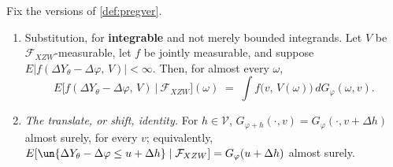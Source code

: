 \begin{lemma}\label{lem:psubst}
Fix the versions of \cref{def:pregver}.
\begin{enumerate}
\item[(i)] Substitution, for \textbf{integrable} and not merely bounded integrands. Let $V$ be
$\mathcal F_{XZW}$-measurable, let $f$ be jointly measurable, and suppose
$E\big|f(\Delta Y_\theta-\Delta\varphi,\,V)\big|<\infty$. Then, for almost every $\omega$,
\[
E\big[f(\Delta Y_\theta-\Delta\varphi,\,V)\ \big|\ \mathcal F_{XZW}\big](\omega)
\;=\;\int f\big(v,\,V(\omega)\big)\,dG_\varphi(\omega,v) .
\]
\item[(ii)] \emph{The translate, or shift, identity.} For $h\in\mathcal V$,
$G_{\varphi+h}(\cdot,v)=G_\varphi(\cdot,v+\Delta h)$ almost surely, for every $v$; equivalently,
$E[\un\{\Delta Y_\theta-\Delta\varphi\le u+\Delta h\}\mid\mathcal F_{XZW}]=G_\varphi(u+\Delta h)$ almost
surely.
\end{enumerate}
\end{lemma}

